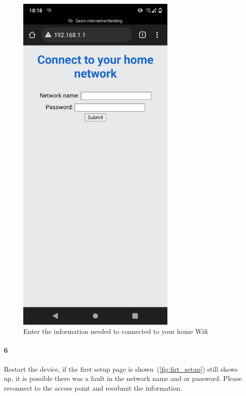 \documentclass[11pt]{article}
\begin{document}
\begin{figure}[H]
        \begin{minipage}{0.45\textwidth}
            \centering
            \includegraphics[width=0.7\textwidth]{step_6}
            \caption{Enter the information needed to connected to your home Wifi}
            \label{fig:step_6}
        \end{minipage}
    \end{figure}

    \paragraph{6} Restart the device, if the first setup page is shown~(\textcolor{blue}{\cref{fig:firt_setup}}) still shows up, it is possible there was a fault in the network name and or password.
    Please reconnect to the access point and resubmit the information.
\end{document}
